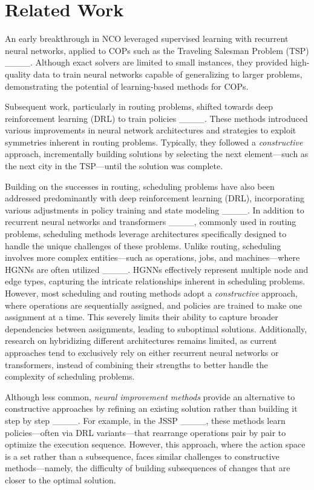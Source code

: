 \section{Related Work}
\label{sec:state_of_the_art}

An early breakthrough in NCO leveraged supervised learning with recurrent neural networks, applied to COPs such as the Traveling Salesman Problem (TSP) ____. Although exact solvers are limited to small instances, they provided high-quality data to train neural networks capable of generalizing to larger problems, demonstrating the potential of learning-based methods for COPs.

Subsequent work, particularly in routing problems, shifted towards deep reinforcement learning (DRL) to train policies ____. These methods introduced various improvements in neural network architectures and strategies to exploit symmetries inherent in routing problems. Typically, they followed a \emph{constructive} approach, incrementally building solutions by selecting the next element—such as the next city in the TSP—until the solution was complete.

Building on the successes in routing, scheduling problems have also been addressed predominantly with deep reinforcement learning (DRL), incorporating various adjustments in policy training and state modeling ____. In addition to recurrent neural networks and transformers ____, commonly used in routing problems, scheduling methods leverage architectures specifically designed to handle the unique challenges of these problems. Unlike routing, scheduling involves more complex entities—such as operations, jobs, and machines—where HGNNs are often utilized ____. HGNNs effectively represent multiple node and edge types, capturing the intricate relationships inherent in scheduling problems. However, most scheduling and routing methods adopt a \emph{constructive} approach, where operations are sequentially assigned, and policies are trained to make one assignment at a time. This severely limits their ability to capture broader dependencies between assignments, leading to suboptimal solutions. Additionally, research on hybridizing different architectures remains limited, as current approaches tend to exclusively rely on either recurrent neural networks or transformers, instead of combining their strengths to better handle the complexity of scheduling problems.

Although less common, \emph{neural improvement methods} provide an alternative to constructive approaches by refining an existing solution rather than building it step by step ____. For example, in the JSSP ____, these methods learn policies—often via DRL variants—that rearrange operations pair by pair to optimize the execution sequence. However, this approach, where the action space is a set rather than a subsequence, faces similar challenges to constructive methods—namely, the difficulty of building subsequences of changes that are closer to the optimal solution.


